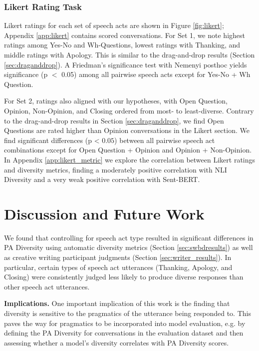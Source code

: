 \documentclass[11pt]{article}
\newcommand{\edivshortspace}{PA Diversity }
\begin{document}
\subsubsection{Likert Rating Task}
Likert ratings for each set of speech acts are shown in Figure \ref{fig:likert}; Appendix \ref{app:likert} contains scored conversations.  For Set 1, we note highest ratings among Yes-No and Wh-Questions, lowest ratings with Thanking, and middle ratings with Apology.  This is similar to the drag-and-drop results (Section \ref{sec:draganddrop}). A Friedman's significance test with Nemenyi posthoc yields significance (p $<$ 0.05) among all pairwise speech acts except for Yes-No + Wh Question.

For Set 2, ratings also aligned with our hypotheses, with Open Question, Opinion, Non-Opinion, and Closing ordered from most- to least-diverse.  Contrary to the drag-and-drop results in Section \ref{sec:draganddrop}, we find Open Questions are rated higher than Opinion conversations in the Likert section.  We find significant differences (p < $0.05$) between all pairwise speech act combinations except for Open Question + Opinion and Opinion + Non-Opinion.
In Appendix \ref{app:likert_metric} we explore the correlation between Likert ratings and diversity metrics, finding a moderately positive correlation with NLI Diversity and a very weak positive correlation with Sent-BERT.



\section{Discussion and Future Work}\label{sec:discussion}

We found that controlling for speech act type resulted in significant differences in \edivshortspace using automatic diversity metrics (Section \ref{sec:swbdresults}) as well as   creative writing participant judgments (Section \ref{sec:writer_results}).  In particular, certain types of   speech act utterances (Thanking, Apology, and Closing) were consistently judged less likely to produce diverse responses than other speech act utterances. 

\textbf{Implications.}
One important implication of this work is the finding that diversity is sensitive to the pragmatics of the utterance being responded to.
This paves the way for pragmatics to be incorporated into model evaluation, e.g. by defining the \edivshortspace for  conversations in the evaluation dataset and then assessing whether a model's diversity correlates with  \edivshortspace scores.
\end{document}
